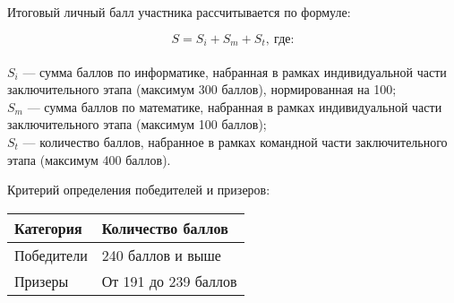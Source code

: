 Итоговый личный балл участника рассчитывается по формуле:

$$S = S_i + S_m + S_t, \: \text{где:}$$\\ 
$S_i$ — сумма баллов по информатике, набранная в рамках индивидуальной части заключительного этапа (максимум 300 баллов), нормированная на 100;\\
$S_m$ — сумма баллов по математике, набранная в рамках индивидуальной части заключительного этапа (максимум 100 баллов);\\
$S_t$ — количество баллов, набранное в рамках командной части заключительного этапа (максимум 400 баллов).

Критерий определения победителей и призеров:
\begin{center}
    \begin{tabular}{|l|l|}
        \hline
        Категория&Количество баллов\\
        \hline
        Победители&240 баллов и выше\\
        \hline
        Призеры&От 191 до 239 баллов\\
        \hline
    \end{tabular}
\end{center}
